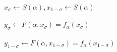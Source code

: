 \documentclass[10pt,a4paper]{article}
\begin{document}
\ \\$x_{\sigma}\leftarrow S(\alpha), x_{1-\sigma}\leftarrow S(\alpha)$\\
\ \\$y_{\sigma}\leftarrow F(\alpha,x_{\sigma})=f_{\alpha}(x_{\sigma})$\\
\ \\$y_{1-\sigma}\leftarrow F(\alpha,x_{1-\sigma})=f_{\alpha}(x_{1-\sigma})$\\
\end{document}
